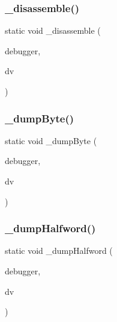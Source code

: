 \subsubsection{\texorpdfstring{\+\_\+disassemble()}{\_disassemble()}}
{\footnotesize\ttfamily static void \+\_\+disassemble (\begin{DoxyParamCaption}\item[{struct C\+L\+I\+Debugger $\ast$}]{debugger,  }\item[{struct C\+L\+I\+Debug\+Vector $\ast$}]{dv }\end{DoxyParamCaption})\hspace{0.3cm}{\ttfamily [static]}}

\mbox{\label{debugger_2cli-debugger_8c_aa3f29a9b8e86f5f883ecf4653be807ea}} 
\subsubsection{\texorpdfstring{\+\_\+dump\+Byte()}{\_dumpByte()}}
{\footnotesize\ttfamily static void \+\_\+dump\+Byte (\begin{DoxyParamCaption}\item[{struct C\+L\+I\+Debugger $\ast$}]{debugger,  }\item[{struct C\+L\+I\+Debug\+Vector $\ast$}]{dv }\end{DoxyParamCaption})\hspace{0.3cm}{\ttfamily [static]}}

\mbox{\label{debugger_2cli-debugger_8c_ac233be27c06307973bd28ec5ca5a8138}} 
\subsubsection{\texorpdfstring{\+\_\+dump\+Halfword()}{\_dumpHalfword()}}
{\footnotesize\ttfamily static void \+\_\+dump\+Halfword (\begin{DoxyParamCaption}\item[{struct C\+L\+I\+Debugger $\ast$}]{debugger,  }\item[{struct C\+L\+I\+Debug\+Vector $\ast$}]{dv }\end{DoxyParamCaption})\hspace{0.3cm}{\ttfamily [static]}}

